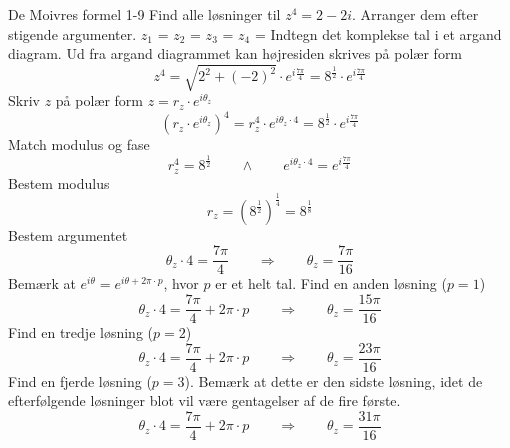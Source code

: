 \documentclass{article}
\begin{document}
\newpage
\begin{exercise}{De Moivres formel 1-9}
Find alle løsninger til $z^4 = 2 - 2i$.
Arranger dem efter stigende argumenter.
$z_1$ = 
$z_2$ = 
$z_3$ = 
$z_4$ = 
\hint
Indtegn det komplekse tal i et argand diagram.
\hint
Ud fra argand diagrammet kan højresiden skrives på polær form
\[z^4 = \sqrt{2^2 + (-2)^2} \cdot e^{i \frac{7 \pi}{4}} = 8^{\frac{1}{2}} \cdot e^{i \frac{7 \pi}{4}}
\]
\hint
Skriv $z$ på polær form $z = r_z \cdot e^{i \theta_z}$
\[\left(r_z \cdot e^{i \theta_z}\right)^4 = r_z^4 \cdot e^{i \theta_z \cdot 4} = 8^{\frac{1}{2}} \cdot e^{i \frac{7 \pi}{4}}
\]
\hint
Match modulus og fase
\[r_z^4 = 8^{\frac{1}{2}} \qquad \wedge \qquad e^{i \theta_z \cdot 4} = e^{i \frac{7 \pi}{4}}
\]
\hint
Bestem modulus
\[r_z = \left(8^{\frac{1}{2}} \right)^{\frac{1}{4}} = 8^{\frac{1}{8}}
\]
\hint
Bestem argumentet
\[\theta_z \cdot 4 = \frac{7 \pi}{4} \qquad \Rightarrow \qquad \theta_z = \frac{7\pi}{16}
\]
\hint
Bemærk at $e^{i \theta} = e^{i \theta + 2 \pi \cdot p}$, hvor $p$ er et helt tal.
\hint
Find en anden løsning ($p = 1$)
\[\theta_z \cdot 4 = \frac{7\pi}{4} + 2 \pi \cdot p \qquad \Rightarrow \qquad \theta_z = \frac{15 \pi}{16}
\]
\hint
Find en tredje løsning ($p = 2$)
\[\theta_z \cdot 4 = \frac{7\pi}{4} + 2 \pi \cdot p \qquad \Rightarrow \qquad \theta_z = \frac{23 \pi}{16}
\]
\hint
Find en fjerde løsning ($p = 3$).
Bemærk at dette er den sidste løsning, idet de efterfølgende
løsninger blot vil være gentagelser af de fire første.
\[\theta_z \cdot 4 = \frac{7\pi}{4} + 2 \pi \cdot p \qquad \Rightarrow \qquad \theta_z = \frac{31 \pi}{16}
\]
\end{exercise}
\newpage
\end{document}
